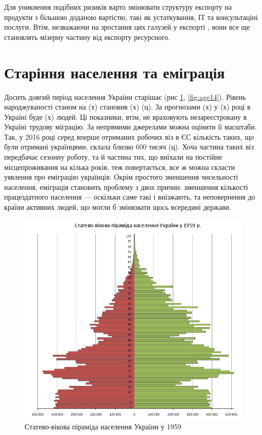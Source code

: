         Для уникнення подібних ризиків варто змінювати структуру експорту на продукти з більшою доданою вартістю,
        такі як устаткування, ІТ та консультаціні послуги. Втім, незважаючи на зростання цих галузей у експорті \cite{export2016},
        вони все ще становлять мізерну частину від експорту ресурсного.


        \section{Старіння населення та еміграція}
            Досить довгий період населення України старішає (рис \ref{fig:age59}, \ref{fig:age14}). Рівень народжуваності станом на (х) становив (х) (ц). 
            За прогнозами (х) у (х) році в Україні буде (х) людей. Ці показники, втім, не враховують незареєстровану в 
            Україні трудову міграцію. За непрямими джерелами можна оцінити її масштаби. Так, у 2016 році серед вперше отриманих
            робочих віз в ЄС кількість таких, що були отримані українцями, склала близко 600 тисяч (ц). Хоча частина таких
            віз передбачає сезонну роботу, та й частина тих, що виїхали на постійне місцепроживання на кілька років, теж
            повертається, все ж можна скласти уявлення про еміграцію українців. Окрім простого зменшення чисельності населення,
            еміграція становить проблему з двох причин: зменшення кількості працездатного населення --- оскільки саме такі і
            виїзжають, та неповернення до країни активних людей, що могли б змінювати щось всередині держави.

            \begin{figure}[!htp]
                \centering
                \includegraphics[scale = 0.4]{PNG/PopulationPyramideUkraine1959.PNG}
                \caption{Статево-вікова піраміда населення України у 1959}
                \label{fig:age59}
            \end{figure}

